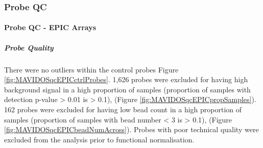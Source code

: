 \documentclass[]{book}
\let\oldparagraph\paragraph
\renewcommand{\paragraph}[1]{\oldparagraph{#1}\mbox{}}
\let\oldsubparagraph\subparagraph
\renewcommand{\subparagraph}[1]{\oldsubparagraph{#1}\mbox{}}
\begin{document}
\hypertarget{probe-qc}{%
\subsubsection{Probe QC}\label{probe-qc}}

\hypertarget{probe-qc---epic-arrays}{%
\paragraph{Probe QC - EPIC Arrays}\label{probe-qc---epic-arrays}}

\hypertarget{probe-quality}{%
\subparagraph{Probe Quality}\label{probe-quality}}

There were no outliers within the control probes Figure \ref{fig:MAVIDOSqcEPICctrlProbes}. 1,626 probes were excluded for having high background signal in a high proportion of samples (proportion of samples with detection p-value \textgreater{} 0.01 is \textgreater{} 0.1), (Figure \ref{fig:MAVIDOSqcEPICpropSamples}). 162 probes were excluded for having low bead count in a high proportion of samples (proportion of samples with bead number \textless{} 3 is \textgreater{} 0.1), (Figure \ref{fig:MAVIDOSqcEPICbeadNumAcross}). Probes with poor technical quality were excluded from the analysis prior to functional normalisation.
\end{document}
